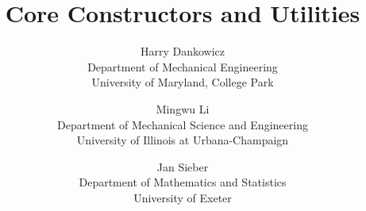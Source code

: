 \documentclass[final,12pt]{article}
\begin{document}
\lstset{language=coco}

\title{Core Constructors and Utilities}

\author{Harry Dankowicz\\Department of Mechanical Engineering\\University of Maryland, College Park\and Mingwu Li\\Department of Mechanical Science and Engineering\\University of Illinois at Urbana-Champaign\and Jan Sieber\\Department of Mathematics and Statistics\\University of Exeter}

\maketitle

\tableofcontents
\newpage

\end{document}
